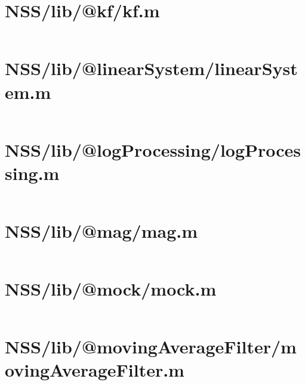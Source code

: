 \pagebreak
\section*{NSS/lib/@kf/kf.m}\label{code:NSS/lib/@kf/kf.m}
\inputminted[linenos,fontsize=\scriptsize]{matlab}{/home/dcouture/git/mathyourlife/TSatPy/beta_versions/matlab_object_oriented/lib/@kf/kf.m}

\pagebreak
\section*{NSS/lib/@linearSystem/linearSystem.m}\label{code:NSS/lib/@linearSystem/linearSystem.m}
\inputminted[linenos,fontsize=\scriptsize]{matlab}{/home/dcouture/git/mathyourlife/TSatPy/beta_versions/matlab_object_oriented/lib/@linearSystem/linearSystem.m}

\pagebreak
\section*{NSS/lib/@logProcessing/logProcessing.m}\label{code:NSS/lib/@logProcessing/logProcessing.m}
\inputminted[linenos,fontsize=\scriptsize]{matlab}{/home/dcouture/git/mathyourlife/TSatPy/beta_versions/matlab_object_oriented/lib/@logProcessing/logProcessing.m}

\pagebreak
\section*{NSS/lib/@mag/mag.m}\label{code:NSS/lib/@mag/mag.m}
\inputminted[linenos,fontsize=\scriptsize]{matlab}{/home/dcouture/git/mathyourlife/TSatPy/beta_versions/matlab_object_oriented/lib/@mag/mag.m}

\pagebreak
\section*{NSS/lib/@mock/mock.m}\label{code:NSS/lib/@mock/mock.m}
\inputminted[linenos,fontsize=\scriptsize]{matlab}{/home/dcouture/git/mathyourlife/TSatPy/beta_versions/matlab_object_oriented/lib/@mock/mock.m}

\pagebreak
\section*{NSS/lib/@movingAverageFilter/movingAverageFilter.m}\label{code:NSS/lib/@movingAverageFilter/movingAverageFilter.m}
\inputminted[linenos,fontsize=\scriptsize]{matlab}{/home/dcouture/git/mathyourlife/TSatPy/beta_versions/matlab_object_oriented/lib/@movingAverageFilter/movingAverageFilter.m}

